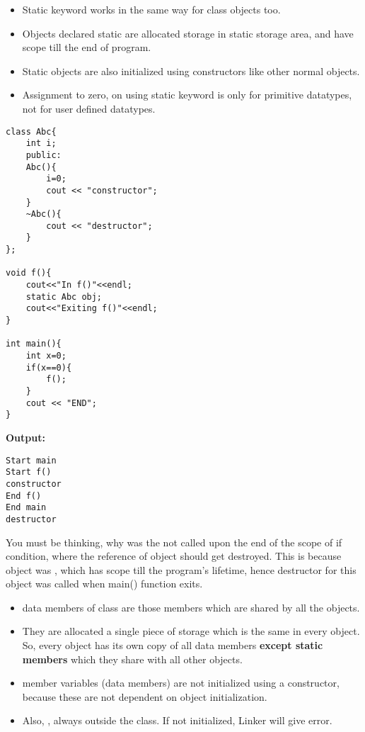 
\begin{itemize}
\tightlist
    \item Static keyword works in the same way for class objects too.
    \item Objects declared static are allocated storage in static storage area, and have scope till the end of program.
    \item Static objects are also initialized using constructors like other normal objects.
    \item Assignment to zero, on using static keyword is only for primitive datatypes, not for user defined datatypes.
\end{itemize}
 
\begin{verbatim}
class Abc{
    int i;
    public:
    Abc(){
        i=0;
        cout << "constructor";
    }
    ~Abc(){
        cout << "destructor";
    }
};

void f(){
    cout<<"In f()"<<endl;
    static Abc obj;
    cout<<"Exiting f()"<<endl;
}

int main(){
    int x=0;
    if(x==0){
        f();
    }
    cout << "END";
}
\end{verbatim}

\textbf{Output:}
\begin{verbatim}
Start main
Start f()
constructor
End f()
End main
destructor
\end{verbatim}

You must be thinking, why was the  not called upon the end of the scope of if condition, where the reference of object  should get destroyed. This is because object was , which has scope till the program's lifetime, hence destructor for this object was called when main() function exits.


\begin{itemize}
\tightlist
    \item {} data members of class are those members which are shared by all the objects.
    \item They are allocated a single piece of storage which is the same in every object.
    \itm So, every object has its own copy of all data members \textbf{except static members} which they share with all other objects.
    \item {} member variables (data members) are not initialized using a constructor, because these are not dependent on object initialization.
    \item Also, , always outside the class. If not initialized, Linker will give error.
\end{itemize}


